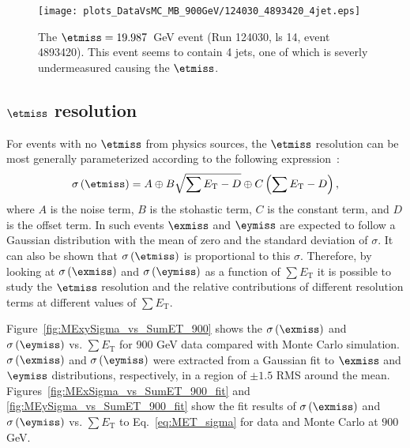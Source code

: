 \begin{figure}[h!]
  \texttt{[image: plots\_DataVsMC\_MB\_900GeV/124030\_4893420\_4jet.eps]}
  \caption{The $\etmiss=19.987$~GeV event (Run 124030, ls
    14, event 4893420). This event seems to contain 4 jets, one of which
    is severly undermeasured causing the $\etmiss$.
    \label{fig:DataVsMC_MB_900_evd3}}
\end{figure}


\clearpage

\subsection{$\etmiss$ resolution}

For events with no $\etmiss$ from physics sources, the $\etmiss$ resolution can be most generally parameterized
according to the following expression~\cite{CMS:AN_2007_041}:
\begin{equation}
  \sigma\left(\etmiss\right)=A \oplus B\sqrt{\sum E_\text{T}-D} \oplus C\left(\sum E_\text{T}-D\right),
  \label{eq:MET_sigma}
\end{equation}
where $A$ is the noise term, $B$ is the stohastic term, $C$ is the constant term, and $D$ is the offset term. In such events
$\exmiss$ and $\eymiss$ are expected to follow a Gaussian distribution with the mean of zero and the standard deviation
of $\sigma$. It can also be shown that $\sigma\left(\etmiss\right)$ is proportional to this $\sigma$. Therefore,
by looking at $\sigma\left(\exmiss\right)$ and $\sigma\left(\eymiss\right)$ as a function of $\sum E_\text{T}$ it is possible to
study the $\etmiss$ resolution and the relative contributions of different resolution terms at different values of $\sum E_\text{T}$.

Figure~\ref{fig:MExySigma_vs_SumET_900} shows the $\sigma\left(\exmiss\right)$ and $\sigma\left(\eymiss\right)$ 
vs. $\sum E_\text{T}$ for 900 GeV data compared with Monte Carlo simulation. $\sigma\left(\exmiss\right)$ and $\sigma\left(\eymiss\right)$
were extracted from a Gaussian fit to $\exmiss$ and $\eymiss$ distributions, respectively, in a region of $\pm 1.5$ RMS around the mean.
Figures~\ref{fig:MExSigma_vs_SumET_900_fit} and \ref{fig:MEySigma_vs_SumET_900_fit} show the fit results 
of $\sigma\left(\exmiss\right)$ and $\sigma\left(\eymiss\right)$ vs. $\sum E_\text{T}$ to Eq.~\ref{eq:MET_sigma} 
for data and Monte Carlo at $900$ GeV.

